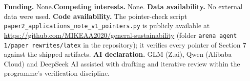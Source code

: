 \documentclass[10pt,twocolumn]{article}
\theoremstyle{definition}
\begin{document}
\textbf{Funding.} None.\quad \textbf{Competing interests.} None.\quad
\textbf{Data availability.} No external data were used.\quad
\textbf{Code availability.} The pointer-check script
\texttt{paper2\_applications\_note\_v1\_pointers.py} is publicly available
at \url{https://github.com/MIKEAA2020/general-sustainability} (folder
\texttt{arena agent 1/paper rewrites/latex} in the repository); it
verifies every pointer of Section 7 against the shipped
artifacts.\quad
\textbf{AI declaration.} GLM (Z.ai), Qwen (Alibaba Cloud) and DeepSeek AI
assisted with drafting and iterative review within the programme's
verification discipline.
\end{document}
